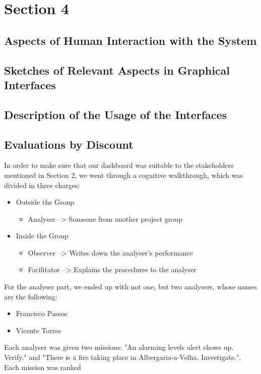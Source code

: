 \chapter{Section 4}
\section{Aspects of Human Interaction with the System}
\section{Sketches of Relevant Aspects in Graphical Interfaces}
\section{Description of the Usage of the Interfaces}
\section{Evaluations by Discount}
In order to make sure that our dashboard was suitable 
to the stakeholders mentioned in Section 2, we went 
through a cognitive walkthrough, which was divided in 
three charges: 
\begin{itemize}
    \item Outside the Group
    \begin{itemize}
    \item Analyser --> Someone from another project group 
    \end{itemize}
    \item Inside the Group
    \begin{itemize}
    \item Observer --> Writes down the analyser's performance
    \item Facilitator --> Explains the procedures to the 
    analyser
    \end{itemize}
\end{itemize} \par 
For the analyser part, we ended up with not one, but two 
analysers, whose names are the following:
\begin{itemize}
    \item Francisco Passos
    \item Vicente Torres
\end{itemize} \par
Each analyser was given two missions: "An alarming levels 
alert shows up. Verify." and "There is a fire taking place 
in Albergaria-a-Velha. Investigate.". Each mission was ranked 
